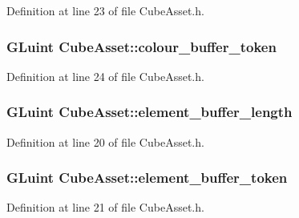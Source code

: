 Definition at line 23 of file Cube\+Asset.\+h.

\hypertarget{class_cube_asset_a75f98d346175cd91cdee04f1885f5327}{}
\subsubsection[{colour\+\_\+buffer\+\_\+token}]{\setlength{\rightskip}{0pt plus 5cm}G\+Luint Cube\+Asset\+::colour\+\_\+buffer\+\_\+token\hspace{0.3cm}{\ttfamily [private]}}\label{class_cube_asset_a75f98d346175cd91cdee04f1885f5327}


Definition at line 24 of file Cube\+Asset.\+h.

\hypertarget{class_cube_asset_ac66c2ec869f392515dad4ebda1fe4792}{}
\subsubsection[{element\+\_\+buffer\+\_\+length}]{\setlength{\rightskip}{0pt plus 5cm}G\+Luint Cube\+Asset\+::element\+\_\+buffer\+\_\+length\hspace{0.3cm}{\ttfamily [private]}}\label{class_cube_asset_ac66c2ec869f392515dad4ebda1fe4792}


Definition at line 20 of file Cube\+Asset.\+h.

\hypertarget{class_cube_asset_a4fae699256e7c5633a8174a93ca8a0ec}{}
\subsubsection[{element\+\_\+buffer\+\_\+token}]{\setlength{\rightskip}{0pt plus 5cm}G\+Luint Cube\+Asset\+::element\+\_\+buffer\+\_\+token\hspace{0.3cm}{\ttfamily [private]}}\label{class_cube_asset_a4fae699256e7c5633a8174a93ca8a0ec}


Definition at line 21 of file Cube\+Asset.\+h.

\hypertarget{class_cube_asset_a49b69783f209cc8268a8be7d46c803d6}{}
